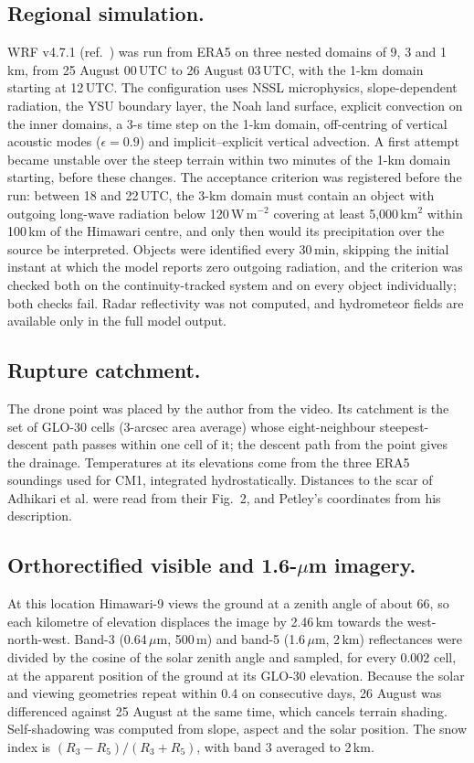 \documentclass{nature}
\begin{document}
\begin{methods}
\subsection{Regional simulation.}
WRF v4.7.1 (ref.~) was run from ERA5 on three nested domains of 9, 3 and 1\,km, from 25 August 00\,UTC to 26 August 03\,UTC, with the 1-km domain starting at 12\,UTC. The configuration uses NSSL microphysics, slope-dependent radiation, the YSU boundary layer, the Noah land surface, explicit convection on the inner domains, a 3-s time step on the 1-km domain, off-centring of vertical acoustic modes ($\epsilon=0.9$) and implicit--explicit vertical advection\cite{wicker2020}. A first attempt became unstable over the steep terrain within two minutes of the 1-km domain starting, before these changes. The acceptance criterion was registered before the run: between 18 and 22\,UTC, the 3-km domain must contain an object with outgoing long-wave radiation below 120\,W\,m$^{-2}$ covering at least 5,000\,km$^{2}$ within 100\,km of the Himawari centre, and only then would its precipitation over the source be interpreted. Objects were identified every 30\,min, skipping the initial instant at which the model reports zero outgoing radiation, and the criterion was checked both on the continuity-tracked system and on every object individually; both checks fail. Radar reflectivity was not computed, and hydrometeor fields are available only in the full model output.

\subsection{Rupture catchment.}
The drone point was placed by the author from the video. Its catchment is the set of GLO-30 cells (3-arcsec area average) whose eight-neighbour steepest-descent path passes within one cell of it; the descent path from the point gives the drainage. Temperatures at its elevations come from the three ERA5 soundings used for CM1, integrated hydrostatically. Distances to the scar of Adhikari et al. were read from their Fig.~2, and Petley's coordinates from his description\cite{adhikari2026,petley2026}.

\subsection{Orthorectified visible and 1.6-$\mu$m imagery.}
At this location Himawari-9 views the ground at a zenith angle of about 66\textdegree, so each kilometre of elevation displaces the image by 2.46\,km towards the west-north-west. Band-3 (0.64\,$\mu$m, 500\,m) and band-5 (1.6\,$\mu$m, 2\,km) reflectances were divided by the cosine of the solar zenith angle and sampled, for every 0.002\textdegree{} cell, at the apparent position of the ground at its GLO-30 elevation. Because the solar and viewing geometries repeat within 0.4\textdegree{} on consecutive days, 26 August was differenced against 25 August at the same time, which cancels terrain shading. Self-shadowing was computed from slope, aspect and the solar position. The snow index is $(R_{3}-R_{5})/(R_{3}+R_{5})$, with band 3 averaged to 2\,km.


\end{methods}
\end{document}
